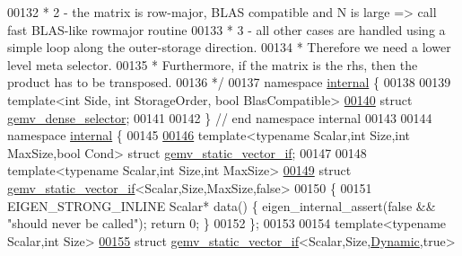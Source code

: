 \begin{DoxyCode}
00132 \textcolor{comment}{ *   2 - the matrix is row-major, BLAS compatible and N is large => call fast BLAS-like rowmajor routine}
00133 \textcolor{comment}{ *   3 - all other cases are handled using a simple loop along the outer-storage direction.}
00134 \textcolor{comment}{ *  Therefore we need a lower level meta selector.}
00135 \textcolor{comment}{ *  Furthermore, if the matrix is the rhs, then the product has to be transposed.}
00136 \textcolor{comment}{ */}
00137 \textcolor{keyword}{namespace }\hyperlink{namespaceinternal}{internal} \{
00138 
00139 \textcolor{keyword}{template}<\textcolor{keywordtype}{int} S\textcolor{keywordtype}{id}e, \textcolor{keywordtype}{int} StorageOrder, \textcolor{keywordtype}{bool} BlasCompatible>
\hyperlink{struct_eigen_1_1internal_1_1gemv__dense__selector}{00140} \textcolor{keyword}{struct }\hyperlink{struct_eigen_1_1internal_1_1gemv__dense__selector}{gemv\_dense\_selector};
00141 
00142 \} \textcolor{comment}{// end namespace internal}
00143 
00144 \textcolor{keyword}{namespace }\hyperlink{namespaceinternal}{internal} \{
00145 
\hyperlink{struct_eigen_1_1internal_1_1gemv__static__vector__if}{00146} \textcolor{keyword}{template}<\textcolor{keyword}{typename} Scalar,\textcolor{keywordtype}{int} Size,\textcolor{keywordtype}{int} MaxSize,\textcolor{keywordtype}{bool} Cond> \textcolor{keyword}{struct }
      \hyperlink{struct_eigen_1_1internal_1_1gemv__static__vector__if}{gemv\_static\_vector\_if};
00147 
00148 \textcolor{keyword}{template}<\textcolor{keyword}{typename} Scalar,\textcolor{keywordtype}{int} Size,\textcolor{keywordtype}{int} MaxSize>
\hyperlink{struct_eigen_1_1internal_1_1gemv__static__vector__if_3_01_scalar_00_01_size_00_01_max_size_00_01false_01_4}{00149} \textcolor{keyword}{struct }\hyperlink{struct_eigen_1_1internal_1_1gemv__static__vector__if}{gemv\_static\_vector\_if}<Scalar,Size,MaxSize,false>
00150 \{
00151   EIGEN\_STRONG\_INLINE  Scalar* data() \{ eigen\_internal\_assert(\textcolor{keyword}{false} && \textcolor{stringliteral}{"should never be called"}); \textcolor{keywordflow}{return} 0;
       \}
00152 \};
00153 
00154 \textcolor{keyword}{template}<\textcolor{keyword}{typename} Scalar,\textcolor{keywordtype}{int} Size>
\hyperlink{struct_eigen_1_1internal_1_1gemv__static__vector__if_3_01_scalar_00_01_size_00_01_dynamic_00_01true_01_4}{00155} \textcolor{keyword}{struct }\hyperlink{struct_eigen_1_1internal_1_1gemv__static__vector__if}{gemv\_static\_vector\_if}<Scalar,Size,\hyperlink{namespace_eigen_ad81fa7195215a0ce30017dfac309f0b2}{Dynamic},true>

\end{DoxyCode}
